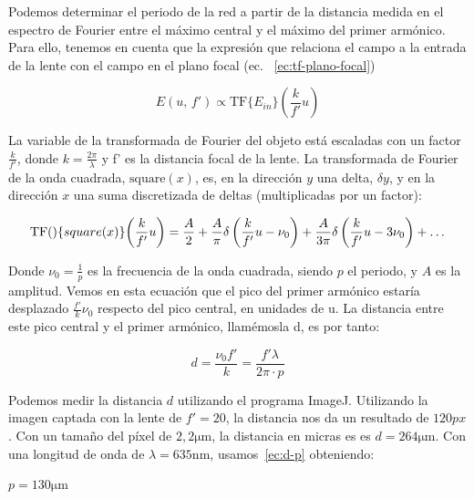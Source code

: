 \documentclass{./packages/optica-article}
\begin{document}
Podemos determinar el periodo de la red a partir de la distancia medida en el espectro de Fourier entre el máximo central y el máximo del primer armónico. Para ello, tenemos en cuenta que la expresión que relaciona el campo a la entrada de la lente con el campo en el plano focal (ec. ~\ref{ec:tf-plano-focal})

\begin{equation}
    E(u,\,f') \propto \textrm{TF}\{E_{in}\}\left(\frac{k}{f'}u\right)
    \label{ec:tf-plano-focal}
\end{equation}

La variable de la transformada de Fourier del objeto está escaladas con un factor $\frac{k}{f'}$, donde $k=\frac{2\pi}{\lambda}$ y f' es la distancia focal de la lente. La transformada de Fourier de la onda cuadrada, $\textrm{square}(x)$, es, en la dirección $y$ una delta, $\delta y$, y en la dirección $x$ una suma discretizada de deltas (multiplicadas por un factor):

\begin{equation}
    \textrm{TF}\qty\{square(x)\}\qty(\frac{k}{f'}u) = \frac{A}{2} + \frac{A}{\pi}  \delta\left(\frac{k}{f'} u - \nu_0\right) + \frac{A}{3\pi} \delta\left(\frac{k}{f'}u - 3\nu_0\right) + \ldots
\end{equation}

Donde $\nu_0 = \frac{1}{p}$ es la frecuencia de la onda cuadrada, siendo $p$ el periodo, y $A$ es la amplitud. Vemos en esta ecuación que el pico del primer armónico estaría desplazado $\frac{f'}{k} \nu_0$ respecto del pico central, en unidades de u. La distancia entre este pico central y el primer armónico, llamémosla d, es por tanto:

\begin{equation}
    d = \frac{\nu_0 f'}{k} = \frac{f'\lambda}{2\pi \cdot p}
    \label{ec:d-p}
\end{equation}

Podemos medir la distancia $d$ utilizando el programa ImageJ. Utilizando la imagen captada con la lente de $f' = 20$, la distancia nos da un resultado de $120 px$. Con un tamaño del píxel de $2,2 \unit{\micro\meter}$, la distancia en micras es es $d = 264 \unit{\micro\meter}$. Con una longitud de onda de $\lambda = 635 \unit{\nano\meter}$, usamos~\ref{ec:d-p} obteniendo:

\begin{center}
    $p = 130 \unit{\micro\meter}$
\end{center}
\end{document}
